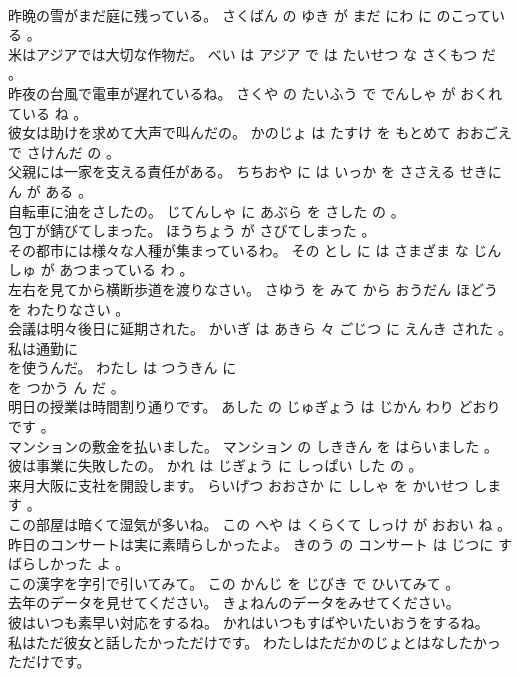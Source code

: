 \documentclass[8pt]{extreport}
\begin{document}
\begin{CJK}{UTF8}{min}
\\	昨晩の雪がまだ庭に残っている。	さくばん の ゆき が まだ にわ に のこっている 。 
\\	米はアジアでは大切な作物だ。	べい は アジア で は たいせつ な さくもつ だ 。 
\\	昨夜の台風で電車が遅れているね。	さくや の たいふう で でんしゃ が おくれている ね 。 
\\	彼女は助けを求めて大声で叫んだの。	かのじょ は たすけ を もとめて おおごえ で さけんだ の 。 
\\	父親には一家を支える責任がある。	ちちおや に は いっか を ささえる せきにん が ある 。 
\\	自転車に油をさしたの。	じてんしゃ に あぶら を さした の 。 
\\	包丁が錆びてしまった。	ほうちょう が さびてしまった 。 
\\	その都市には様々な人種が集まっているわ。	その とし に は さまざま な じんしゅ が あつまっている わ 。 
\\	左右を見てから横断歩道を渡りなさい。	さゆう を みて から おうだん ほどう を わたりなさい 。 
\\	会議は明々後日に延期された。	かいぎ は あきら 々 ごじつ に えんき された 。 
\\	私は通勤に
\\	を使うんだ。	わたし は つうきん に 
\\	を つかう ん だ 。 
\\	明日の授業は時間割り通りです。	あした の じゅぎょう は じかん わり どおり です 。 
\\	マンションの敷金を払いました。	マンション の しききん を はらいました 。 
\\	彼は事業に失敗したの。	かれ は じぎょう に しっぱい した の 。 
\\	来月大阪に支社を開設します。	らいげつ おおさか に ししゃ を かいせつ します 。 
\\	この部屋は暗くて湿気が多いね。	この へや は くらくて しっけ が おおい ね 。 
\\	昨日のコンサートは実に素晴らしかったよ。	きのう の コンサート は じつに すばらしかった よ 。 
\\	この漢字を字引で引いてみて。	この かんじ を じびき で ひいてみて 。 
\\	去年のデータを見せてください。	きょねんのデータをみせてください。 
\\	彼はいつも素早い対応をするね。	かれはいつもすばやいたいおうをするね。 
\\	私はただ彼女と話したかっただけです。	わたしはただかのじょとはなしたかっただけです。 

\end{CJK}
\end{document}
